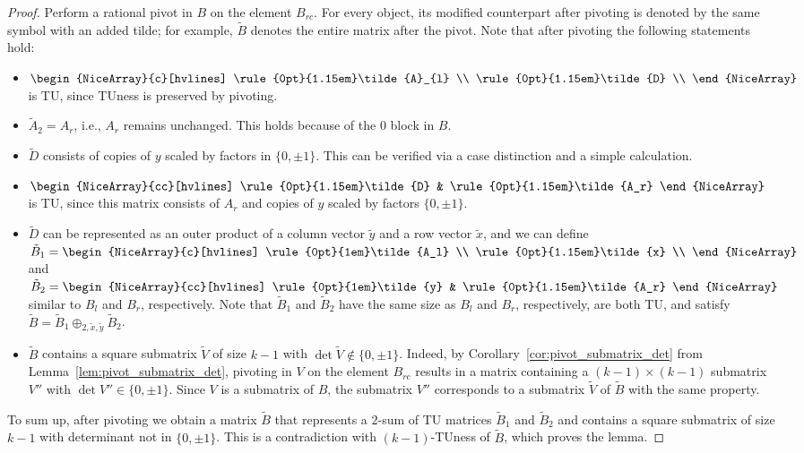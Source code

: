 \begin{proof}
    Perform a rational pivot in $B$ on the element $B_{rc}$. For every object, its modified counterpart after pivoting is denoted by the same symbol with an added tilde; for example, $\tilde{B}$ denotes the entire matrix after the pivot. Note that after pivoting the following statements hold:
    \begin{itemize}
        \item $\begin{NiceArray}{c}[hvlines] \rule{0pt}{1.15em}\tilde{A}_{l} \\ \rule{0pt}{1.15em}\tilde{D} \\ \end{NiceArray}$ is TU, since TUness is preserved by pivoting.
        \item $\tilde{A}_{2} = A_{r}$, i.e., $A_{r}$ remains unchanged. This holds because of the $0$ block in $B$.
        \item $\tilde{D}$ consists of copies of $y$ scaled by factors in $\{0, \pm 1\}$. This can be verified via a case distinction and a simple calculation.
        \item $\begin{NiceArray}{cc}[hvlines] \rule{0pt}{1.15em}\tilde{D} & \rule{0pt}{1.15em}\tilde{A_r} \end{NiceArray}$ is TU, since this matrix consists of $A_{r}$ and copies of $y$ scaled by factors $\{0, \pm 1\}$.
        \item $\tilde{D}$ can be represented as an outer product of a column vector $\tilde{y}$ and a row vector $\tilde{x}$, and we can define $\tilde{B}_{1} = \begin{NiceArray}{c}[hvlines] \rule{0pt}{1em}\tilde{A_l} \\ \rule{0pt}{1.15em}\tilde{x} \\ \end{NiceArray}$ and $\tilde{B}_{2} =\begin{NiceArray}{cc}[hvlines] \rule{0pt}{1em}\tilde{y} & \rule{0pt}{1.15em}\tilde{A_r} \end{NiceArray}$ similar to $B_{l}$ and $B_{r}$, respectively. Note that $\tilde{B}_{1}$ and $\tilde{B}_{2}$ have the same size as $B_{l}$ and $B_{r}$, respectively, are both TU, and satisfy $\tilde{B} = \tilde{B}_{1} \oplus_{2, \tilde{x}, \tilde{y}} \tilde{B}_{2}$.
        \item $\tilde{B}$ contains a square submatrix $\tilde{V}$ of size $k - 1$ with $\det \tilde{V} \notin \{0, \pm 1\}$. Indeed, by Corollary~\ref{cor:pivot_submatrix_det} from Lemma~\ref{lem:pivot_submatrix_det}, pivoting in $V$ on the element $B_{rc}$ results in a matrix containing a $(k - 1) \times (k - 1)$ submatrix $V''$ with $\det V'' \in \{0, \pm 1\}$. Since $V$ is a submatrix of $B$, the submatrix $V''$ corresponds to a submatrix $\tilde{V}$ of $\tilde{B}$ with the same property.
    \end{itemize}
    To sum up, after pivoting we obtain a matrix $\tilde{B}$ that represents a $2$-sum of TU matrices $\tilde{B}_{1}$ and $\tilde{B}_{2}$ and contains a square submatrix of size $k - 1$ with determinant not in $\{0, \pm 1\}$. This is a contradiction with $(k - 1)$-TUness of $\tilde{B}$, which proves the lemma.
\end{proof}

